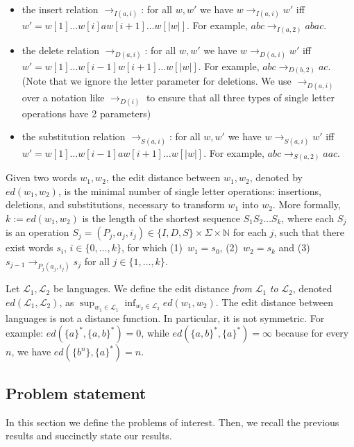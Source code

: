 \documentclass{CSML}
\newcommand{\lang}{\mathcal{L}}
\newcommand{\ed}{ed}
\newcommand{\NN}{\mathbb{N}}
\begin{document}
\begin{itemize}
\item 
the insert relation $\rightarrow_{I(a,i)}$: for all $w,w'$ we have $w\rightarrow_{I(a,i)}w'$ iff $w'=w[1]\dots w[i] a w[i+1]\dots w[|w|]$. For example, $abc\rightarrow_{I(a,2)}abac$. 
\item the delete relation $\rightarrow_{D(a,i)}$: for all $w,w'$ we have $w\rightarrow_{D(a,i)}w'$ 
iff $w'=w[1]\dots w[i-1] w[i+1]\dots w[|w|]$. For example, $abc\rightarrow_{D(b,2)}ac$. (Note that we ignore the letter parameter for deletions. We use $\rightarrow_{D(a,i)}$ over a notation like $\rightarrow_{D(i)}$ to ensure that all three types of single letter operations have 2 parameters)
\item the substitution relation $\rightarrow_{S(a,i)}$: for all $w,w'$ we have $w\rightarrow_{S(a,i)}w'$ 
iff $w'=w[1]\dots w[i-1]aw[i+1]\dots w[|w|]$. For example, $abc\rightarrow_{S(a,2)}aac$.
\end{itemize}


 Given two words $w_1, w_2$, the edit 
distance between $w_1, w_2$, denoted by $\ed(w_1, w_2)$, is the minimal number of single letter operations:
insertions, deletions, and substitutions, necessary to transform $w_1$ into $w_2$.
More formally, $k:=\ed(w_1,w_2)$ is the length of the shortest sequence $S_1S_2\dots S_k$, 
 where each $S_j$ is an operation $S_j = (P_j,a_j,i_j)\in\{I,D,S\}\times \Sigma\times \NN$ for each $j$, such that there exist words $s_i$, $i\in \{0,\dots,k\}$, for which (1)~$w_1=s_0$, (2)~$w_2=s_k$ and (3)~$s_{j-1}\rightarrow_{P_j(a_j,i_j)}s_{j}$ for all $j\in \{1,\dots,k\}$.



Let $\lang_1, \lang_2$ be languages. We define the edit distance 
\emph{from} $\lang_1$ \emph{to} $\lang_2$, denoted $\ed(\lang_1, \lang_2)$, as
$\sup_{w_1 \in \lang_1} \inf_{w_2 \in \lang_2} \ed(w_1, w_2)$.
The edit distance between languages is not a distance function. In particular,
it is not symmetric. 
For example: $\ed(\{a\}^*, \{a,b\}^*) = 0$, while
$\ed(\{a,b\}^*, \{a\}^*) = \infty$ because for every $n$, we have 
$\ed(\{ b^n \}, \{a\}^*) = n$.

\subsection{Problem statement}

In this section we define the problems of interest. Then, we recall the previous results 
and succinctly state our results. 
\end{document}
